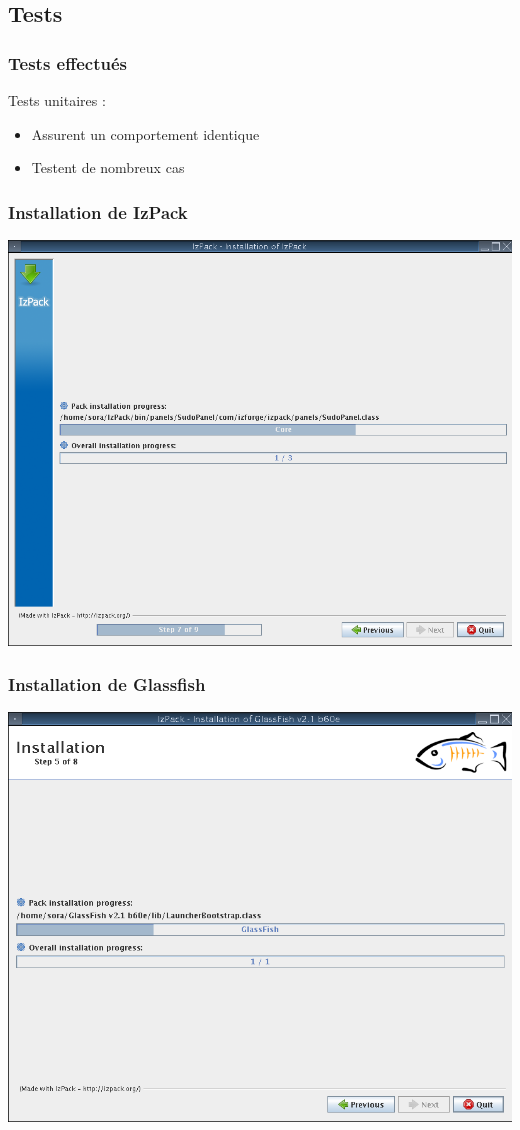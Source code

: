 \subsection{Tests}
\begin{frame}\frametitle{Tests effectués}
\begin{minipage}[c]{.9\linewidth}
Tests unitaires :
\begin{itemize}
	\item Assurent un comportement identique
	\item Testent de nombreux cas
\end{itemize}
\end{minipage}
\end{frame}
\begin{frame}\frametitle{Installation de IzPack}
	\centering
	\includegraphics[width=\linewidth]{../image/installationIzpack.png}
\end{frame}
\begin{frame}\frametitle{Installation de Glassfish}
	\centering
	\includegraphics[width=\linewidth]{../image/installationGlassfish.png}
\end{frame}
